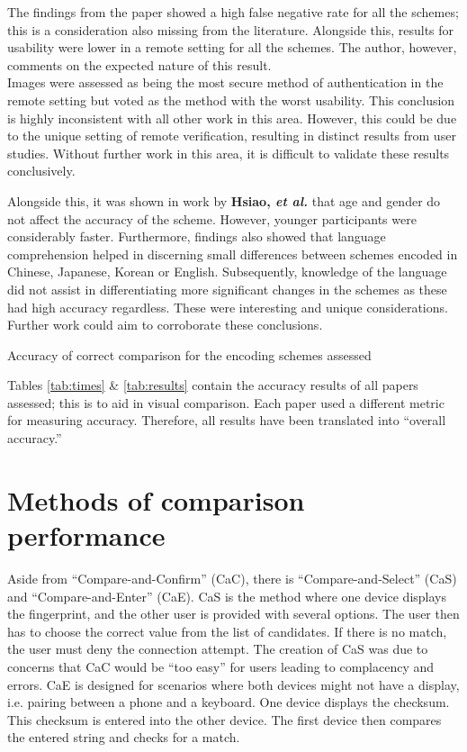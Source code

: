 The findings from the paper showed a high false negative rate for all the schemes; this is a consideration also missing from the literature. Alongside this, results for usability were lower in a remote setting for all the schemes. The author, however, comments on the expected nature of this result.\\
Images were assessed as being the most secure method of authentication in the remote setting but voted as the method with the worst usability. This conclusion is highly inconsistent with all other work in this area. However, this could be due to the unique setting of remote verification, resulting in distinct results from user studies. Without further work in this area, it is difficult to validate these results conclusively.

Alongside this, it was shown in work by \textbf{Hsiao, \textit{et al.}}\cite{hsiao2009study} that age and gender do not affect the accuracy of the scheme. However, younger participants were considerably faster. Furthermore, findings also showed that language comprehension helped in discerning small differences between schemes encoded in Chinese, Japanese, Korean or English. Subsequently, knowledge of the language did not assist in differentiating more significant changes in the schemes as these had high accuracy regardless. These were interesting and unique considerations. Further work could aim to corroborate these conclusions.

\begin{table}[h!]
    \makebox[\textwidth][c]{
        
    }%
    \caption{Accuracy of correct comparison for the encoding schemes assessed}
    \label{tab:results}
\end{table}

Tables \ref{tab:times} \& \ref{tab:results} contain the accuracy results of all papers assessed; this is to aid in visual comparison. Each paper used a different metric for measuring accuracy. Therefore, all results have been translated into ``overall accuracy.''

\section*{Methods of comparison performance}
Aside 
from ``Compare-and-Confirm'' (CaC), there is ``Compare-and-Select'' (CaS) and ``Compare-and-Enter'' (CaE). CaS is the method where one device displays the fingerprint, and the other user is provided with several options. The user then has to choose the correct value from the list of candidates. If there is no match, the user must deny the connection attempt. The creation of CaS was due to concerns that CaC would be ``too easy'' for users leading to complacency and errors\cite{uzun2007usability}. CaE is designed for scenarios where both devices might not have a display, i.e. pairing between a phone and a keyboard. One device displays the checksum. This checksum is entered into the other device. The first device then compares the entered string and checks for a match.


